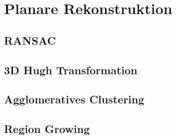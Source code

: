\section{Planare Rekonstruktion}

\subsection{RANSAC}

\subsection{3D Hugh Transformation}

\subsection{Agglomeratives Clustering}

\subsection{Region Growing}



